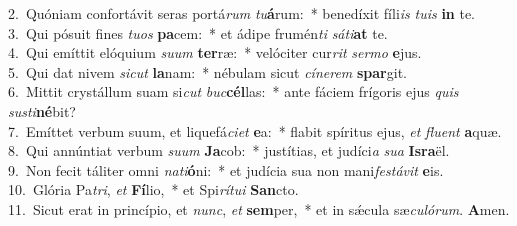 {2.~}Quóniam confortávit seras portá\textit{rum} \textit{tu}\textbf{á}rum:~* benedíxit fíli\textit{is} \textit{tu}\textit{is} \textbf{in} te.\\
{3.~}Qui pósuit fines \textit{tu}\textit{os} \textbf{pa}cem:~* et ádipe frumén\textit{ti} \textit{sá}\textit{ti}\textbf{at} te.\\
{4.~}Qui emíttit elóquium \textit{su}\textit{um} \textbf{ter}ræ:~* velóciter cur\textit{rit} \textit{ser}\textit{mo} \textbf{e}jus.\\
{5.~}Qui dat nivem \textit{si}\textit{cut} \textbf{la}nam:~* nébulam sicut \textit{cí}\textit{ne}\textit{rem} \textbf{spar}git.\\
{6.~}Mittit crystállum suam si\textit{cut} \textit{buc}\textbf{cél}las:~* ante fáciem frígoris ejus \textit{quis} \textit{su}\textit{sti}\textbf{né}bit?\\
{7.~}Emíttet verbum suum, et liquefá\textit{ci}\textit{et} \textbf{e}a:~* flabit spíritus ejus, \textit{et} \textit{flu}\textit{ent} \textbf{a}quæ.\\
{8.~}Qui annúntiat verbum \textit{su}\textit{um} \textbf{Ja}cob:~* justítias, et judíci\textit{a} \textit{su}\textit{a} \textbf{Is}\textbf{ra}ël.\\
{9.~}Non fecit táliter omni \textit{na}\textit{ti}\textbf{ó}ni:~* et judícia sua non mani\textit{fe}\textit{stá}\textit{vit} \textbf{e}is.\\
{10.~}Glória Pa\textit{tri}, \textit{et} \textbf{Fí}lio,~* et Spi\textit{rí}\textit{tu}\textit{i} \textbf{San}cto.\\
{11.~}Sicut erat in princípio, et \textit{nunc}, \textit{et} \textbf{sem}per,~* et in sǽcula sæ\textit{cu}\textit{ló}\textit{rum}. \textbf{A}men.\\
